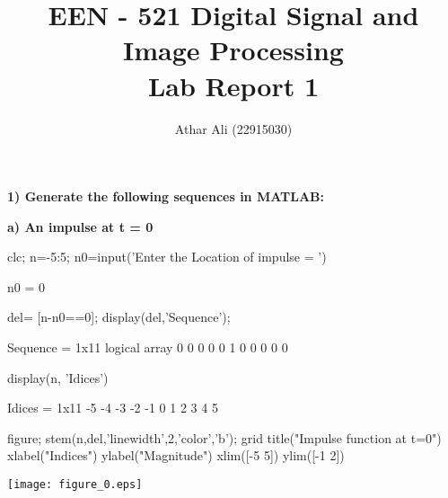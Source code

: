 \documentclass[12pt, onecolumn]{IEEEtran}
\begin{document}
	\author{Athar Ali (22915030)}
	\title{\bf{ \large EEN - 521 Digital Signal and Image Processing\\ Lab Report 1}}
	\maketitle 
	 {}
	
	
	
	\vspace{1em}
	\begin{par}
		\begin{flushleft}
			\textbf{1) Generate the following sequences in MATLAB:}
		\end{flushleft}
	\end{par}
	
	\begin{par}
		\begin{flushleft}
			\textbf{a) An impulse at t = 0} 
		\end{flushleft}
	\end{par}
	
	\begin{matlabcode}
		clc;
		n=-5:5;
		n0=input('Enter the Location of impulse = ')
	\end{matlabcode}
	\begin{matlaboutput}
		n0 = 0
	\end{matlaboutput}
	\begin{matlabcode}
		del= [n-n0==0];
		display(del,'Sequence');
	\end{matlabcode}
	\begin{matlaboutput}
		Sequence = 1x11 logical array    
		0   0   0   0   0   1   0   0   0   0   0
		
	\end{matlaboutput}
	\begin{matlabcode}
		display(n, 'Idices')
	\end{matlabcode}
	\begin{matlaboutput}
		Idices = 1x11    
		-5    -4    -3    -2    -1     0     1     2     3     4     5
		
	\end{matlaboutput}
	\begin{matlabcode}
		figure;
		stem(n,del,'linewidth',2,'color','b'); grid
		title("Impulse function at t=0")
		xlabel("Indices")
		ylabel("Magnitude")
		xlim([-5 5])
		ylim([-1 2])
	\end{matlabcode}
	\begin{center}
		\texttt{[image: figure\_0.eps]}
	\end{center}
	
\end{document}
